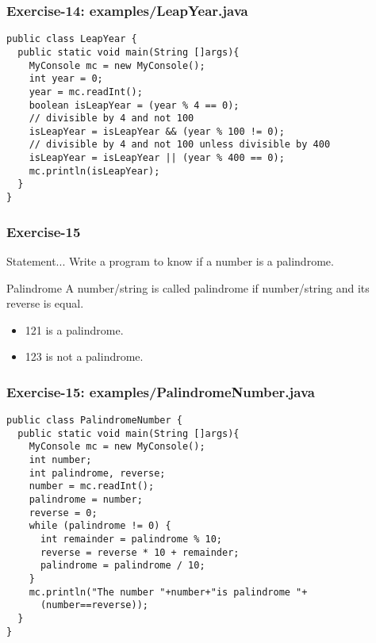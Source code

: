 \documentclass[xcolor=dvipsnames,dvip,notes=show,handout,table]{beamer}
\begin{document}
\begin{frame}[fragile]
\frametitle{Exercise-14: examples/LeapYear.java}
\scriptsize
\begin{lstlisting}
public class LeapYear {
  public static void main(String []args){
    MyConsole mc = new MyConsole();
    int year = 0;
    year = mc.readInt();
    boolean isLeapYear = (year % 4 == 0);
    // divisible by 4 and not 100
    isLeapYear = isLeapYear && (year % 100 != 0);
    // divisible by 4 and not 100 unless divisible by 400
    isLeapYear = isLeapYear || (year % 400 == 0);
    mc.println(isLeapYear);	
  }
}
\end{lstlisting}
\end{frame}



\begin{frame}[fragile]
\frametitle{Exercise-15}
\begin{block}{Statement...}
 Write a program to know if a number is a palindrome.
\end{block}

\begin{exampleblock}{Palindrome}
  A number/string is called palindrome if number/string and its reverse is equal.
  \begin{itemize}
   \item 121 is a palindrome.
   \item 123 is not a palindrome.
  \end{itemize}

\end{exampleblock}


\end{frame}


\begin{frame}[fragile]
\frametitle{Exercise-15: examples/PalindromeNumber.java}
\scriptsize
\begin{lstlisting}
public class PalindromeNumber {
  public static void main(String []args){
    MyConsole mc = new MyConsole();
    int number;
    int palindrome, reverse;
    number = mc.readInt();
    palindrome = number;
    reverse = 0;
    while (palindrome != 0) {
      int remainder = palindrome % 10;
      reverse = reverse * 10 + remainder;
      palindrome = palindrome / 10;
    }
    mc.println("The number "+number+"is palindrome "+ 
      (number==reverse));
  }
}
\end{lstlisting}
\end{frame}
\end{document}
